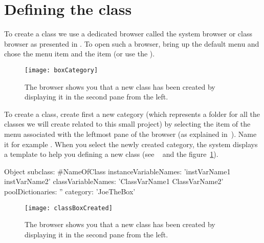 \section{Defining the class }

To create a class we use a dedicated browser called the system browser
 or class browser  as presented in .  To open such a browser, bring up the default menu and chose the menu item  and the item  (or use the ).



\begin{figure}
\begin{center}
\texttt{[image: boxCategory]}
\caption{The browser shows you that a new class has been created by displaying
it in the second pane from the left. \label{fig:boxCategory}}
\end{center}
\end{figure}

To create a class, create first a new category (which represents a
folder for all the classes we will create related to this small
project) by selecting the item  of the menu associated with the
leftmost pane of the browser (as explained in~).  Name
it for example .  When you select the newly created category,
the system displays a template to help you defining a new class (see
~ and the figure~\ref{fig:boxCategory}).

\begin{classdef}\label{cls:template}
Object subclass: \#NameOfClass
   instanceVariableNames: 'instVarName1 instVarName2'
   classVariableNames: 'ClassVarName1 ClassVarName2'
   poolDictionaries: ''
   category: 'JoeTheBox'
\end{classdef}




\begin{figure}
\begin{center}
\texttt{[image: classBoxCreated]}
\caption{The browser shows you that a new class has been created by displaying
it in the second pane from the left. \label{fig:classBoxCreated}}
\end{center}
\end{figure}


